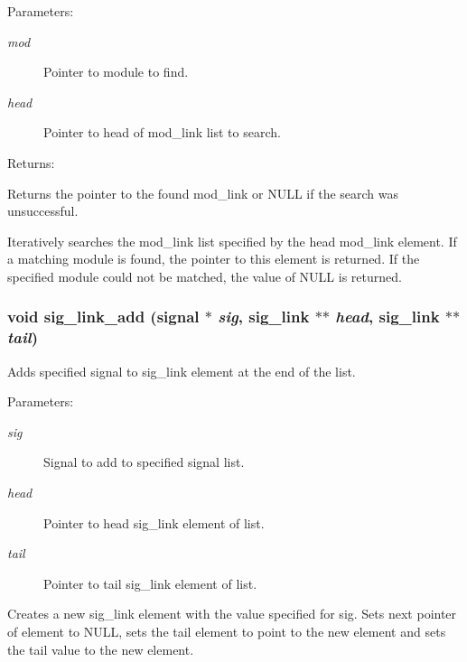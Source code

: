 \begin{Desc}
\item[Parameters: ]\par
\begin{description}
\item[{\em 
mod}]Pointer to module to find. \item[{\em 
head}]Pointer to head of mod\_\-link list to search.\end{description}
\end{Desc}
\begin{Desc}
\item[Returns: ]\par
Returns the pointer to the found mod\_\-link or NULL if the search was unsuccessful.\end{Desc}
Iteratively searches the mod\_\-link list specified by the head mod\_\-link element. If a matching module is found, the pointer to this element is returned. If the specified module could not be matched, the value of NULL is returned. 
\subsubsection{\setlength{\rightskip}{0pt plus 5cm}void sig\_\-link\_\-add ({\bf signal} $\ast$ {\em sig}, {\bf sig\_\-link} $\ast$$\ast$ {\em head}, {\bf sig\_\-link} $\ast$$\ast$ {\em tail})}\label{link_8c_a4}


Adds specified signal to sig\_\-link element at the end of the list.

\begin{Desc}
\item[Parameters: ]\par
\begin{description}
\item[{\em 
sig}]Signal to add to specified signal list. \item[{\em 
head}]Pointer to head sig\_\-link element of list. \item[{\em 
tail}]Pointer to tail sig\_\-link element of list.\end{description}
\end{Desc}
Creates a new sig\_\-link element with the value specified for sig. Sets next pointer of element to NULL, sets the tail element to point to the new element and sets the tail value to the new element. 
